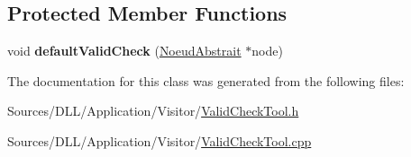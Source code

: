 \subsection*{Protected Member Functions}
\begin{DoxyCompactItemize}
\item 
\hypertarget{group__inf2990_ga58a361b0ca91a2b7acb338d39bc0172a}{}void {\bfseries default\+Valid\+Check} (\hyperlink{class_noeud_abstrait}{Noeud\+Abstrait} $\ast$node)\label{group__inf2990_ga58a361b0ca91a2b7acb338d39bc0172a}

\end{DoxyCompactItemize}


The documentation for this class was generated from the following files\+:\begin{DoxyCompactItemize}
\item 
Sources/\+D\+L\+L/\+Application/\+Visitor/\hyperlink{_valid_check_tool_8h}{Valid\+Check\+Tool.\+h}\item 
Sources/\+D\+L\+L/\+Application/\+Visitor/\hyperlink{_valid_check_tool_8cpp}{Valid\+Check\+Tool.\+cpp}\end{DoxyCompactItemize}
